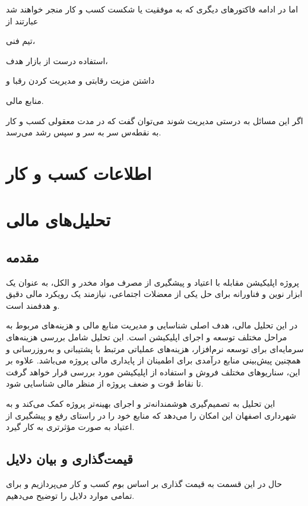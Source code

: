\documentclass[dvipsnames, svgnames, x11names, 11pt]{article}
\begin{document}
اما در ادامه فاکتور‌های دیگری که به موفقیت یا شکست کسب و کار منجر خواهند شد عبارتند از
\begin{inparaitem}
\item 
تیم فنی،
\item 
استفاده درست از بازار هدف،
\item 
داشتن مزیت رقابتی و مدیریت کردن رقبا و
\item 
منابع مالی.
\end{inparaitem}
اگر این مسائل به درستی مدیریت شوند می‌توان گفت که در مدت معقولی کسب و کار به نقطه‌س سر به سر و سپس رشد می‌رسد.

\section{اطلاعات کسب و کار}
\section{تحلیل‌های مالی}
\subsection{مقدمه}
پروژه اپلیکیشن مقابله با اعتیاد و پیشگیری از مصرف مواد مخدر و الکل، به عنوان یک ابزار نوین و فناورانه برای حل یکی از معضلات اجتماعی، نیازمند یک رویکرد مالی دقیق و هدفمند است.

در این تحلیل مالی، هدف اصلی شناسایی و مدیریت منابع مالی و هزینه‌های مربوط به مراحل مختلف توسعه و اجرای اپلیکیشن است. این تحلیل شامل بررسی هزینه‌های سرمایه‌ای برای توسعه نرم‌افزار، هزینه‌های عملیاتی مرتبط با پشتیبانی و به‌روزرسانی و همچنین پیش‌بینی منابع درآمدی برای اطمینان از پایداری مالی پروژه می‌باشد. علاوه بر این، سناریوهای مختلف فروش و استفاده از اپلیکیشن مورد بررسی قرار خواهد گرفت تا نقاط قوت و ضعف پروژه از منظر مالی شناسایی شود.

این تحلیل به تصمیم‌گیری هوشمندانه‌تر و اجرای بهینه‌تر پروژه کمک می‌کند و به شهرداری اصفهان این امکان را می‌دهد که منابع خود را در راستای رفع و پیشگیری از اعتیاد به صورت مؤثرتری به کار گیرد.

\subsection{قیمت‌گذاری و بیان دلایل}
حال در این قسمت به قیمت گذاری بر اساس بوم کسب و کار می‌پردازیم و برای تمامی موارد دلایل را توضیح می‌دهیم.
\end{document}
